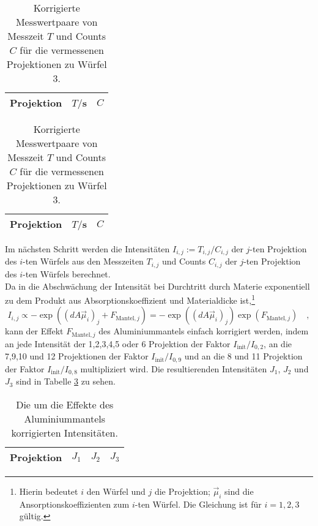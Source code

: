 \begin{table}
\centering
\begin{tabular}{ccc}
\toprule
\midrule
Projektion &$T/$s & $C$ \\
\midrule

\midrule
\bottomrule
\end{tabular}
\caption{Korrigierte Messwertpaare von Messzeit $T$ und Counts $C$ für die vermessenen 
Projektionen zu 
Würfel 2.} \label{tab:2}

\begin{tabular}{ccc}
\toprule
\midrule
Projektion &$T/$s & $C$ \\
\midrule

\midrule
\bottomrule
\end{tabular}
\caption{Korrigierte Messwertpaare von Messzeit $T$ und Counts $C$ für die vermessenen 
Projektionen zu 
Würfel 3.} \label{tab:3}
\end{table}
\clearpage
Im nächsten Schritt werden die Intensitäten $I_{i,j}:=T_{i,j}/C_{i,j}$ der $j$-ten Projektion des 
$i$-ten 
Würfels aus den Messzeiten $T_{i,j}$ und Counts $C_{i,j}$ der $j$-ten Projektion des 
$i$-ten Würfels berechnet.\\
Da in die Abschwächung der Intensität bei Durchtritt durch Materie exponentiell zu dem Produkt 
aus Absorptionskoeffizient und Materialdicke ist,\footnote{Hierin bedeutet $i$ den Würfel und 
$j$ die Projektion; $\vec{\mu}_i$ sind die Ansorptionskoeffizienten zum $i$-ten Würfel. Die 
Gleichung ist für $i=1,2,3$ gültig.}
\begin{equation}
I_{i,j} \propto -\exp\left( (d A \vec{\mu}_i)_{j} + F_{\text{Mantel},j} \right)=
-\exp\left( (d A \vec{\mu}_i)_j \right) \exp\left( F_{\text{Mantel},j} \right) \quad ,
\end{equation} 
kann der Effekt $F_{\text{Mantel},j}$ des Aluminiummantels einfach 
korrigiert werden, indem an jede Intensität der 1,2,3,4,5 oder 6 Projektion der Faktor 
$I_\text{init}/I_{0,2}$, an die 7,9,10 und 12 Projektionen der Faktor $I_\text{init}/I_{0,9}$ und 
an die 8 und 11 Projektion der Faktor $I_\text{init}/I_{0,8}$ multipliziert wird. Die 
resultierenden Intensitäten $J_1$, $J_2$ und $J_3$ sind in Tabelle \ref{tab:korr} zu sehen.
\begin{table}[h]
\centering
\begin{tabular}{cccc}
\toprule
\midrule
Projektion &	$J_1$ & $J_2$ & $J_3$ \\
\midrule

\midrule
\bottomrule
\end{tabular}
\caption{Die um die Effekte des Aluminiummantels korrigierten Intensitäten.} \label{tab:korr}
\end{table}
\clearpage

